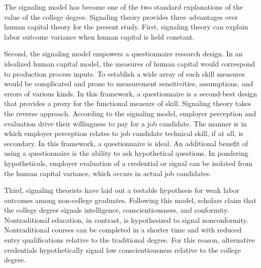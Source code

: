 \documentclass[review]{elsarticle}
\begin{document}
The signaling model has become one of the two standard explanations of the value of the college degree.
Signaling theory provides three advantages over human capital theory for the present study.
First, signaling theory can explain labor outcome variance when human capital is held constant.

Second, the signaling model empowers a questionnaire research design.
In an idealized human capital model, the measures of human capital would correspond to production process inputs.
To establish a wide array of such skill measures would be complicated and prone to measurement sensitivities, assumptions, and errors of various kinds.
In this framework, a questionnaire is a second-best design that provides a proxy for the functional measure of skill.
Signaling theory takes the reverse approach.
According to the signaling model, employer perception and evaluation drive their willingness to pay for a job candidate.
The manner is in which employer perception relates to job candidate technical skill, if at all, is secondary.
In this framework, a questionnaire is ideal.
An additional benefit of using a questionnaire is the ability to ask hypothetical questions.
In pondering hypotheticals,
employer evaluation of a credential or signal can be isolated from the human capital variance,
which occurs in actual job candidates.

Third, signaling theorists have laid out a testable hypothesis for weak labor outcomes among non-college graduates.
Following this model, scholars claim that the college degree signals intelligence, conscientiousness, and conformity\cite{caplan2018case}.
Nontraditional education, in contrast, is hypothesized to signal nonconformity.
Nontraditional courses can be completed in a shorter time and with reduced entry qualifications relative to the traditional degree.
For this reason, alternative credentials hypothetically signal low conscientiousness relative to the college degree.
\end{document}
